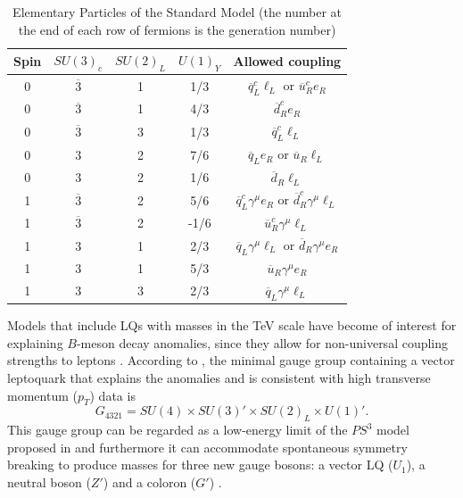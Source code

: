 \begin{table}
    \centering
    \begin{tabular}{c c c c c }
        \toprule
        Spin & $SU(3)_c$ & $SU(2)_L$ & $U(1)_Y$ & Allowed coupling \\ \midrule
        0 & $\overline{3}$ & 1 & 1/3 & $\overline{q}^{c}_{L} \ell_L $ or $\overline{u}_{R}^c e_R$ \\
        0 & $\overline{3}$ & 1 & 4/3 &  $\overline{d}_{R}^c e_R$ \\
        0 & $\overline{3}$ & 3 & 1/3 &  $\overline{q}_{L}^c \ell_L$ \\
        0 & 3 & 2 & 7/6 & $\overline{q}_{L} e_R $ or $\overline{u}_{R} \ell_L$ \\
        0 & 3 & 2 & 1/6 & $\overline{d}_{R} \ell_L$ \\
        1 & $\overline{3}$ & 2 & 5/6 &  $\overline{q}^{c}_{L} \gamma^\mu e_R $ or $\overline{d}_{R}^c \gamma^\mu \ell_L$ \\
        1 & $\overline{3}$ & 2 & -1/6 &  $\overline{u}_{R}^c \gamma^\mu \ell_L$ \\
        1 & 3 & 1 & 2/3 &  $\overline{q}_{L} \gamma^\mu \ell_L$ or $\overline{d}_{R} \gamma^\mu e_R$ \\
        1 & 3 & 1 & 5/3 &  $\overline{u}_{R} \gamma^\mu e_R$ \\
        1 & 3 & 3 & 2/3 &  $\overline{q}_{L} \gamma^\mu \ell_L$ \\
        \bottomrule
    \end{tabular}
    \caption{Elementary Particles of the Standard Model (the number at the end of each row of fermions is the generation number)}
    \label{tab:quantum_num}
\end{table}


Models that include LQs with masses in the TeV scale have become of interest for explaining $B$-meson decay anomalies, since they allow for non-universal coupling strengths to leptons \cite{di_luzio_gauge_2017}. According to \cite{baker_high_2019}, the minimal gauge group containing a vector leptoquark that explains the anomalies and is consistent with high transverse momentum ($p_T$) data is $$G_{4321} = SU(4) \times SU(3)' \times SU(2)_L \times U(1)'.$$ This gauge group can be regarded as a low-energy limit of the $PS^3$ model proposed in \cite{bordone_three-site_2018} and furthermore it can accommodate spontaneous symmetry breaking to produce masses for three new gauge bosons: a vector LQ ($U_1$), a neutral boson ($Z'$) and a coloron ($G'$) \cite{cornella_revisiting_2019}.
 
